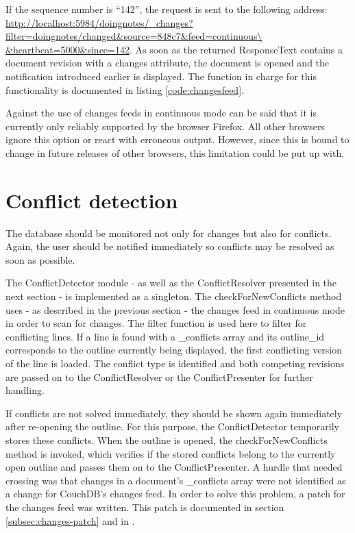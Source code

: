 If the sequence number is \enquote{142}, the request is sent to the following address: \url{http://localhost:5984/doingnotes/\_changes?filter=doingnotes/changed&source=848c7&feed=continuous\ &heartbeat=5000&since=142}. As soon as the returned ResponseText contains a document revision with a {\selectfont changes} attribute, the document is opened and the notification introduced earlier is displayed. The function in charge for this functionality is documented in listing \ref{code:changesfeed}.

Against the use of changes feeds in {\selectfont continuous} mode can be said that it is currently only reliably supported by the browser Firefox. All other browsers ignore this option or react with erroneous output. However, since this is bound to change in future releases of other browsers, this limitation could be put up with.




\section{Conflict detection}
\label{subsec:konflikterkennung}

The database should be monitored not only for changes but also for conflicts. Again, the user should be notified immediately so conflicts may be resolved as soon as possible.

The {\selectfont ConflictDetector} module - as well as the {\selectfont ConflictResolver} presented in the next section - is implemented as a singleton. The {\selectfont checkForNewConflicts} method uses - as described in the previous section - the changes feed in continuous mode in order to scan for changes. The filter function is used here to filter for conflicting lines. If a line is found with a {\selectfont \_conflicts} array and its {\selectfont outline\_id} corresponds to the outline currently being displayed, the first conflicting version of the line is loaded. The conflict type is identified and both competing revisions are passed on to the {\selectfont ConflictResolver} or the {\selectfont ConflictPresenter} for further handling.

If conflicts are not solved immediately, they should be shown again immediately after re-opening the outline. For this purpose, the {\selectfont ConflictDetector} temporarily stores these conflicts. When the outline is opened, the {\selectfont checkForNewConflicts} method is invoked, which verifies if the stored conflicts belong to the currently open outline and passes them on to the {\selectfont ConflictPresenter}. A hurdle that needed crossing was that changes in a document's {\selectfont \_conflicts} array were not identified as a change for CouchDB's changes feed. In order to solve this problem, a patch for the changes feed was written. This patch \cite{jira:changesfeed} is documented in section \ref{subsec:changes-patch} and in \cite{github:changesfeed}.


